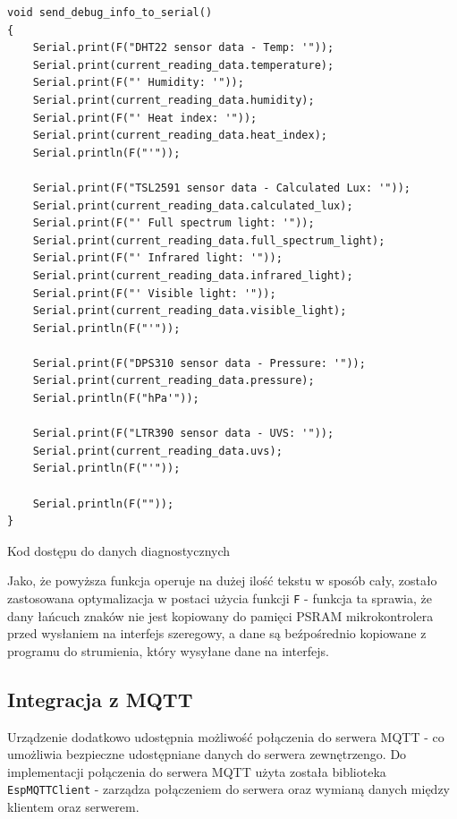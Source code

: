 \documentclass[12pt,a4paper]{article}
\begin{document}
\begin{code}[H]
\begin{verbatim}
void send_debug_info_to_serial()
{
    Serial.print(F("DHT22 sensor data - Temp: '"));
    Serial.print(current_reading_data.temperature);
    Serial.print(F("' Humidity: '"));
    Serial.print(current_reading_data.humidity);
    Serial.print(F("' Heat index: '"));
    Serial.print(current_reading_data.heat_index);
    Serial.println(F("'"));

    Serial.print(F("TSL2591 sensor data - Calculated Lux: '"));
    Serial.print(current_reading_data.calculated_lux);
    Serial.print(F("' Full spectrum light: '"));
    Serial.print(current_reading_data.full_spectrum_light);
    Serial.print(F("' Infrared light: '"));
    Serial.print(current_reading_data.infrared_light);
    Serial.print(F("' Visible light: '"));
    Serial.print(current_reading_data.visible_light);
    Serial.println(F("'"));

    Serial.print(F("DPS310 sensor data - Pressure: '"));
    Serial.print(current_reading_data.pressure);
    Serial.println(F("hPa'"));

    Serial.print(F("LTR390 sensor data - UVS: '"));
    Serial.print(current_reading_data.uvs);
    Serial.println(F("'"));

    Serial.println(F(""));
}
\end{verbatim}
\caption{Kod dostępu do danych diagnostycznych}
\label{diagnostic-data-code}
\end{code}

Jako, że powyższa funkcja operuje na dużej ilość tekstu w sposób cały, zostało zastosowana optymalizacja w postaci użycia funkcji 
\texttt{F} - funkcja ta sprawia, że dany łańcuch znaków nie jest kopiowany do pamięci PSRAM mikrokontrolera przed wysłaniem na interfejs szeregowy, 
a dane są beźpośrednio kopiowane z programu do strumienia, który wysyłane dane na interfejs. 

\subsection{Integracja z MQTT}

Urządzenie dodatkowo udostępnia możliwość połączenia do serwera MQTT - co umożliwia bezpieczne udostępniane danych do serwera zewnętrzengo.
Do implementacji połączenia do serwera MQTT użyta została biblioteka \texttt{EspMQTTClient}\cite{esp32-mqtt-server-library} - 
zarządza połączeniem do serwera oraz wymianą danych między klientem oraz serwerem.
\end{document}
